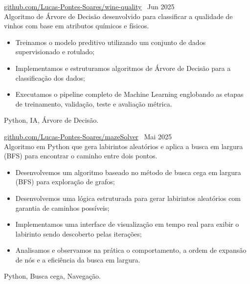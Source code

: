         
 \textbar{}  \href{https://github.com/Lucas-Pontes-Soares/wine-quality}{github.com/Lucas-Pontes-Soares/wine-quality} \hfill\ Jun 2025 \\
Algoritmo de Árvore de Decisão desenvolvido para classificar a qualidade de vinhos com base em atributos químicos e físicos.
\begin{itemize}
    \item Treinamos o modelo preditivo utilizando um conjunto de dados supervisionado e rotulado;
    \item Implementamos e estruturamos algoritmos de Árvore de Decisão para a classificação dos dados;
    \item Executamos o pipeline completo de Machine Learning englobando as etapas de treinamento, validação, teste e avaliação métrica.
\end{itemize}
 Python, IA, Árvore de Decisão.

        
 \textbar{}  \href{https://github.com/Lucas-Pontes-Soares/mazeSolver}{github.com/Lucas-Pontes-Soares/mazeSolver} \hfill\ Mai 2025 \\
Algoritmo em Python que gera labirintos aleatórios e aplica a busca em largura (BFS) para encontrar o caminho entre dois pontos.
\begin{itemize}
    \item Desenvolvemos um algoritmo baseado no método de busca cega em largura (BFS) para exploração de grafos;
    \item Desenvolvemos uma lógica estruturada para gerar labirintos aleatórios com garantia de caminhos possíveis;
    \item Implementamos uma interface de visualização em tempo real para exibir o labirinto sendo descoberto pelas iterações;
    \item Analisamos e observamos na prática o comportamento, a ordem de expansão de nós e a eficiência da busca em largura.
\end{itemize}
 Python, Busca cega, Navegação.

        
